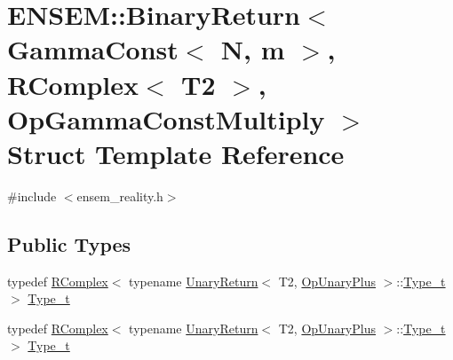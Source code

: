 \hypertarget{structENSEM_1_1BinaryReturn_3_01GammaConst_3_01N_00_01m_01_4_00_01RComplex_3_01T2_01_4_00_01OpGammaConstMultiply_01_4}{}\section{E\+N\+S\+EM\+:\+:Binary\+Return$<$ Gamma\+Const$<$ N, m $>$, R\+Complex$<$ T2 $>$, Op\+Gamma\+Const\+Multiply $>$ Struct Template Reference}
\label{structENSEM_1_1BinaryReturn_3_01GammaConst_3_01N_00_01m_01_4_00_01RComplex_3_01T2_01_4_00_01OpGammaConstMultiply_01_4}


{\ttfamily \#include $<$ensem\+\_\+reality.\+h$>$}

\subsection*{Public Types}
\begin{DoxyCompactItemize}
\item 
typedef \mbox{\hyperlink{classENSEM_1_1RComplex}{R\+Complex}}$<$ typename \mbox{\hyperlink{structENSEM_1_1UnaryReturn}{Unary\+Return}}$<$ T2, \mbox{\hyperlink{structENSEM_1_1OpUnaryPlus}{Op\+Unary\+Plus}} $>$\+::\mbox{\hyperlink{structENSEM_1_1BinaryReturn_3_01GammaConst_3_01N_00_01m_01_4_00_01RComplex_3_01T2_01_4_00_01OpGammaConstMultiply_01_4_ae674dff24be99861079dc4dea357e362}{Type\+\_\+t}} $>$ \mbox{\hyperlink{structENSEM_1_1BinaryReturn_3_01GammaConst_3_01N_00_01m_01_4_00_01RComplex_3_01T2_01_4_00_01OpGammaConstMultiply_01_4_ae674dff24be99861079dc4dea357e362}{Type\+\_\+t}}
\item 
typedef \mbox{\hyperlink{classENSEM_1_1RComplex}{R\+Complex}}$<$ typename \mbox{\hyperlink{structENSEM_1_1UnaryReturn}{Unary\+Return}}$<$ T2, \mbox{\hyperlink{structENSEM_1_1OpUnaryPlus}{Op\+Unary\+Plus}} $>$\+::\mbox{\hyperlink{structENSEM_1_1BinaryReturn_3_01GammaConst_3_01N_00_01m_01_4_00_01RComplex_3_01T2_01_4_00_01OpGammaConstMultiply_01_4_ae674dff24be99861079dc4dea357e362}{Type\+\_\+t}} $>$ \mbox{\hyperlink{structENSEM_1_1BinaryReturn_3_01GammaConst_3_01N_00_01m_01_4_00_01RComplex_3_01T2_01_4_00_01OpGammaConstMultiply_01_4_ae674dff24be99861079dc4dea357e362}{Type\+\_\+t}}
\end{DoxyCompactItemize}


